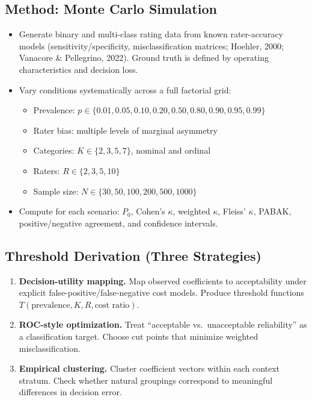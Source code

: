 \documentclass[11pt]{article}
\begin{document}
\subsection*{Method: Monte Carlo Simulation}
\begin{itemize}[nosep, leftmargin=1.5em]
    \item Generate binary and multi-class rating data from known rater-accuracy models (sensitivity/specificity, misclassification matrices; Hoehler, 2000; Vanacore \& Pellegrino, 2022). Ground truth is defined by operating characteristics and decision loss.
    \item Vary conditions systematically across a full factorial grid:
    \begin{itemize}[nosep, leftmargin=1em]
        \item Prevalence: $p \in \{0.01, 0.05, 0.10, 0.20, 0.50, 0.80, 0.90, 0.95, 0.99\}$
        \item Rater bias: multiple levels of marginal asymmetry
        \item Categories: $K \in \{2, 3, 5, 7\}$, nominal and ordinal
        \item Raters: $R \in \{2, 3, 5, 10\}$
        \item Sample size: $N \in \{30, 50, 100, 200, 500, 1000\}$
    \end{itemize}
    \item Compute for each scenario: $P_0$, Cohen's $\kappa$, weighted $\kappa$, Fleiss' $\kappa$, PABAK, positive/negative agreement, and confidence intervals.
\end{itemize}

\subsection*{Threshold Derivation (Three Strategies)}
\begin{enumerate}[nosep, leftmargin=1.5em]
    \item \textbf{Decision-utility mapping.} Map observed coefficients to acceptability under explicit false-positive/false-negative cost models. Produce threshold functions $T(\text{prevalence}, K, R, \text{cost ratio})$.
    \item \textbf{ROC-style optimization.} Treat ``acceptable vs.\ unacceptable reliability'' as a classification target. Choose cut points that minimize weighted misclassification.
    \item \textbf{Empirical clustering.} Cluster coefficient vectors within each context stratum. Check whether natural groupings correspond to meaningful differences in decision error.
\end{enumerate}
\end{document}
